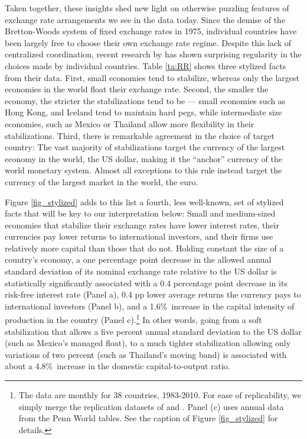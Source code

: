 \documentclass[12pt,letter]{article}
\theoremstyle{break} \theorembodyfont{\normalfont\itshape}
\theoremstyle{break}
\theoremstyle{break} \theorembodyfont{\normalfont\itshape}
\theoremstyle{break} \theorembodyfont{\normalfont\itshape}
\begin{document}
Taken together, these insights shed new light on otherwise puzzling
features of exchange rate arrangements we see in the data today. Since
the demise of the Bretton-Woods system of fixed exchange rates in
1975, individual countries have been largely free to choose their own
exchange rate regime. Despite this lack of centralized coordination,
recent research by \citet*{ilzetzki2018exchange} has shown surprising
regularity in the choices made by individual countries. Table
\ref{ta:RR} shows three stylized facts from their data. First, small
economies tend to stabilize, whereas only the largest economies in the
world float their exchange rate. Second, the smaller the economy, the
stricter the stabilizations tend to be --- small economies such as
Hong Kong, and Iceland tend to maintain hard pegs, while intermediate
size economies, such as Mexico or Thailand allow more flexibility in
their stabilizations. Third, there is remarkable agreement in the
choice of target country: The vast majority of stabilizations target
the currency of the largest economy in the world, the US dollar,
making it the ``anchor'' currency of the world monetary system. Almost
all exceptions to this rule instead target the currency of the largest
market in the world, the euro.

Figure \ref{fig_stylized} adds to this list a fourth, less well-known,
set of stylized facts that will be key to our interpretation below:
Small and medium-sized economies that stabilize their exchange rates
have lower interest rates, their currencies pay lower returns to
international investors, and their firms use relatively more capital
than those that do not. Holding constant the size of a country's
economy, a one percentage point decrease in the allowed annual
standard deviation of its nominal exchange rate relative to the US
dollar is statistically significantly associated with a 0.4 percentage
point decrease in its risk-free interest rate (Panel a), 0.4 pp lower
average returns the currency pays to international investors (Panel
b), and a 1.6\%\ increase in the capital intensity of production in
the country (Panel c).\footnote{The data are monthly for 38 countries,
  1983-2010. For ease of replicability, we simply merge the
  replication datasets of \cite{ilzetzki2018exchange} and
  \cite{HassanMano2015}. Panel (c) uses annual data from the Penn
  World tables. See the caption of Figure \ref{fig_stylized} for
  details. } In other words, going from a soft stabilization that
allows a five percent annual standard deviation to the US dollar (such
as Mexico's managed float), to a much tighter stabilization allowing
only variations of two percent (such as Thailand's moving band) is
associated with about a 4.8\%\ increase in the domestic
capital-to-output ratio.
\end{document}
